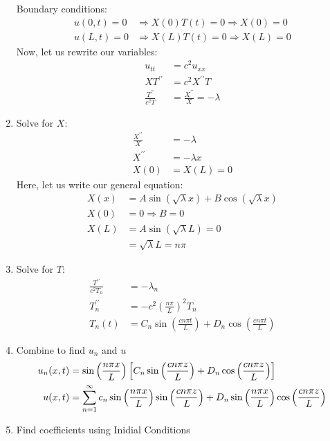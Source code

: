 \begin{enumerate}
  Boundary conditions:
  \begin{align}
    u(0, t) = 0 & \Rightarrow X(0)T(t) = 0 \Rightarrow X(0) = 0\\
    u(L, t) = 0 & \Rightarrow X(L)T(t) = 0 \Rightarrow X(L) = 0
  \end{align}
  Now, let us rewrite our variables:
  \begin{align}
    u_{tt} & = c^2u_{xx}\\
    XT^{\prime\prime} & = c^2 X^{\prime\prime}T\\
    \frac{T^{\prime\prime}}{c^2 T} & = \frac{X^{\prime\prime}}{X} = -\lambda
  \end{align}
  \item Solve for $X$:
  \begin{align}
    \frac{X^{\prime\prime}}{X} & = -\lambda\\
    X^{\prime\prime} & = -\lambda x\\
    X(0) & = X(L) = 0
  \end{align}
  Here, let us write our general equation:
  \begin{align}
    X(x) & = A\sin(\sqrt \lambda x) + B \cos (\sqrt \lambda x)\\
    X(0) & = 0 \Rightarrow B = 0\\
    X(L) & = A \sin(\sqrt \lambda L) = 0\\
    & = \sqrt \lambda L = n \pi
  \end{align}
  \item Solve for $T$:
  \begin{align}
    \frac{T^{\prime\prime}}{c^2 T_n} & = - \lambda_n\\
    T^{\prime\prime}_n & = -c^2 \left( \frac{n \pi}{L} \right)^2 T_n\\
    T_n(t) & = C_n \sin \left( \frac{c n \pi t}{L} \right) + D_n \cos \left( \frac{c n \pi t}{L} \right)
  \end{align}
  \item Combine to find $u_n$ and $u$
  \begin{align}
    u_n(x, t) & = \sin \Big( \frac{n \pi x}{L} \Big) \left[ C_n \sin\left(\frac{ c n \pi z}{L} \right) + D_n \cos \left( \frac{c n \pi z}{L} \right) \right]\\
    u(x, t) & = \sum^\infty_{n = 1} c_n \sin \Big( \frac{n \pi x}{L} \Big) \sin \left( \frac{c n \pi z}{L}\right) + D_n \sin \Big( \frac{n \pi x}{L} \Big) \cos \left( \frac{c n \pi z}{L} \right)
  \end{align}
  \item Find coefficients using Inidial Conditions
  \begin{align}

\end{align}
\end{enumerate}
